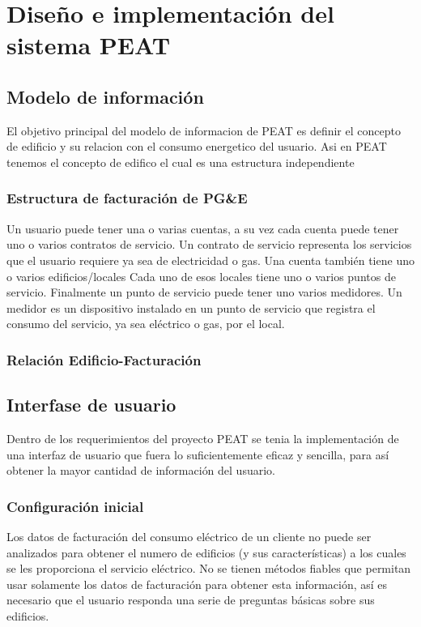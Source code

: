 \chapter{Diseño e implementación del sistema PEAT}

\section{Modelo de información}

El objetivo principal del modelo de informacion de PEAT es definir el concepto de edificio
y su relacion con el consumo energetico del usuario. Asi en PEAT tenemos el concepto de
edifico el cual es una estructura independiente 

\subsection{Estructura de facturación de PG\&E}
Un usuario puede tener una o varias cuentas, a su vez cada cuenta puede tener uno o varios
contratos de servicio. Un contrato de servicio representa los servicios que el usuario
requiere ya sea de electricidad o gas. Una cuenta también tiene uno o varios edificios/locales
Cada uno de esos locales tiene uno o varios puntos de servicio. Finalmente un punto de servicio
puede tener uno varios medidores. Un medidor es un dispositivo instalado en un punto de servicio
que registra el consumo del servicio, ya sea eléctrico o gas, por el local.

\subsection{Relación Edificio-Facturación}

\section{Interfase de usuario}
Dentro de los requerimientos del proyecto PEAT se tenia la implementación de una
interfaz de usuario que fuera lo suficientemente eficaz y sencilla, para así obtener
la mayor cantidad de información del usuario.

\subsection{Configuración inicial}

Los datos de facturación del consumo eléctrico de un cliente no puede ser analizados
para obtener el numero de edificios (y sus características) a los cuales se les
proporciona el servicio eléctrico. No se tienen métodos fiables que permitan
usar solamente los datos de facturación para obtener esta información, así es
necesario que el usuario responda una serie de preguntas básicas sobre sus edificios.

